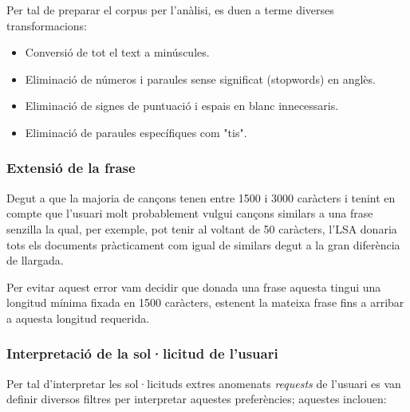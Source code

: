 Per tal de preparar el corpus per l'anàlisi, es duen a terme diverses transformacions:

\begin{itemize}
    \item Conversió de tot el text a minúscules.
    \item Eliminació de números i paraules sense significat (stopwords) en anglès.
    \item Eliminació de signes de puntuació i espais en blanc innecessaris.
    \item Eliminació de paraules específiques com "tis".
\end{itemize}

\subsubsection{Extensió de la frase}

Degut a que la majoria de cançons tenen entre 1500 i 3000 caràcters i tenint en compte que l'usuari molt probablement vulgui cançons similars a una frase senzilla la qual, per exemple, pot tenir al voltant de 50 caràcters, l'LSA donaria tots els documents pràcticament com igual de similars degut a la gran diferència de llargada.

Per evitar aquest error vam decidir que donada una frase aquesta tingui una longitud mínima fixada en 1500 caràcters, estenent la mateixa frase fins a arribar a aquesta longitud requerida.

\subsubsection{Interpretació de la sol·licitud de l'usuari}

Per tal d'interpretar les sol·licituds extres anomenats \textit{requests} de l'usuari es van definir diversos filtres per interpretar aquestes preferències; aquestes inclouen:

